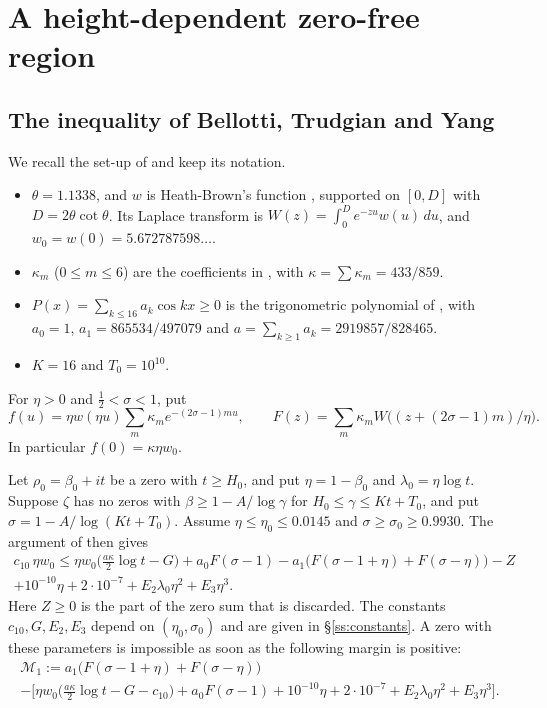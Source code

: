 \section{A height-dependent zero-free region}\label{sec:zfr}

\subsection{The inequality of Bellotti, Trudgian and Yang}
We recall the set-up of \cite{BTY} and keep its notation.
\begin{itemize}
\item $\theta = 1.1338$, and $w$ is Heath-Brown's function \cite[Def.~1]{BTY}, supported on $[0,D]$ with $D = 2\theta\cot\theta$.
  Its Laplace transform is $W(z) = \int_0^D e^{-zu}w(u)\,du$, and $w_0 = w(0) = 5.672787598\ldots$.
\item $\kappa_m$ ($0 \le m \le 6$) are the coefficients in \cite[(18)]{BTY}, with $\kappa = \sum\kappa_m = 433/859$.
\item $P(x) = \sum_{k\le 16}a_k\cos kx \ge 0$ is the trigonometric polynomial of \cite[\S4]{BTY}, with $a_0 = 1$, $a_1 = 865534/497079$ and $a = \sum_{k\ge1}a_k = 2919857/828465$.
\item $K = 16$ and $T_0 = 10^{10}$.
\end{itemize}
For $\eta > 0$ and $\frac12 < \sigma < 1$, put
\[
f(u) = \eta w(\eta u)\sum_{m}\kappa_m e^{-(2\sigma-1)mu}, \qquad F(z) = \sum_m \kappa_m W\big((z + (2\sigma-1)m)/\eta\big).
\]
In particular $f(0) = \kappa\eta w_0$.

Let $\rho_0 = \beta_0 + it$ be a zero with $t \ge H_0$, and put $\eta = 1-\beta_0$ and $\lambda_0 = \eta\log t$.
Suppose $\zeta$ has no zeros with $\beta \ge 1 - A/\log\gamma$ for $H_0 \le \gamma \le Kt + T_0$, and put $\sigma = 1 - A/\log(Kt+T_0)$.
Assume $\eta \le \eta_0 \le 0.0145$ and $\sigma \ge \sigma_0 \ge 0.9930$.
The argument of \cite[Lemma~15]{BTY} then gives
\begin{multline}\label{eq:bty}
c_{10}\,\eta w_0 \le \eta w_0\Big(\frac{a\kappa}2\log t - G\Big) + a_0F(\sigma-1) - a_1\big(F(\sigma-1+\eta) + F(\sigma-\eta)\big) - Z\\ + 10^{-10}\eta + 2\cdot10^{-7} + E_2\lambda_0\eta^2 + E_3\eta^3 .
\end{multline}
Here $Z \ge 0$ is the part of the zero sum that is discarded.
The constants $c_{10}, G, E_2, E_3$ depend on $(\eta_0,\sigma_0)$ and are given in \S\ref{ss:constants}.
A zero with these parameters is impossible as soon as the following margin is positive:
\begin{multline}\label{eq:margin1}
\mathcal M_1 := a_1\big(F(\sigma-1+\eta)+F(\sigma-\eta)\big)\\ - \Big[\eta w_0\big(\tfrac{a\kappa}2\log t - G - c_{10}\big) + a_0F(\sigma-1) + 10^{-10}\eta + 2\cdot 10^{-7} + E_2\lambda_0\eta^2 + E_3\eta^3\Big] .
\end{multline}

